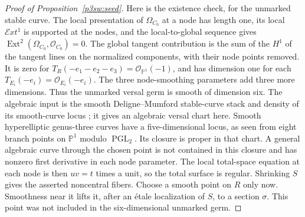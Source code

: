 \documentclass[11pt]{article}
\numberwithin{equation}{section}
\begin{document}
\begin{proof}[Proof of Proposition~\ref{p3sw:seed}]
Here is the existence check, for the unmarked stable curve.  The local
presentation of \(\Omega_{C_0}\) at a node has length one, its local
\(\mathcal Ext^1\) is supported at the nodes, and the local-to-global
sequence gives
\(\operatorname{Ext}^2(\Omega_{C_0},\mathcal O_{C_0})=0\).
The global tangent contribution is the sum of the \(H^1\) of the
tangent lines on the normalized components, with their node points
removed.  It is zero for
\(T_R(-e_1-e_2-e_3)=\mathcal O_{\mathbb P^1}(-1)\), and has
dimension one for each \(T_{E_i}(-e_i)=\mathcal O_{E_i}(-e_i)\).
The three node-smoothing parameters add three more dimensions.
Thus the unmarked versal germ is smooth of dimension six.  The
algebraic input is the smooth Deligne--Mumford stable-curve stack
and density of its smooth-curve locus
\cite[Theorem 109.25.3, Tag 0E99]{P3SWStacks}; it gives an algebraic
versal chart here.  Smooth hyperelliptic genus-three curves have a
five-dimensional locus, as seen from eight branch points on
\(\mathbb P^1\) modulo \(\operatorname{PGL}_2\).  Its closure is
proper in that chart.  A general algebraic curve through the chosen
point is not contained in this closure and has nonzero first
derivative in each node parameter.  The local total-space equation
at each node is then \(uv=t\) times a unit, so the total surface is
regular.  Shrinking \(S\) gives the asserted noncentral fibers.
Choose a smooth point on \(R\) only now.  Smoothness near it lifts it,
after an \'etale localization of \(S\), to a section \(\sigma\).
This point was not included in the six-dimensional unmarked germ.


\end{proof}
\end{document}
